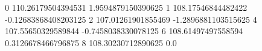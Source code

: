 0 110.26179504394531 1.9594879150390625
1 108.17546844482422 -0.12683868408203125
2 107.01261901855469 -1.2896881103515625
4 107.55650329589844 -0.7458038330078125
6 108.61497497558594 0.3126678466796875
8 108.30230712890625 0.0
